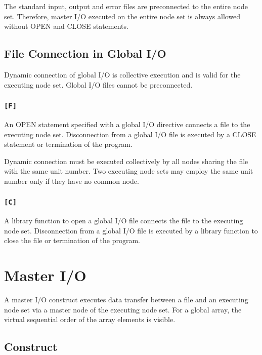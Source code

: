   The standard input, output and error files are preconnected to the
  entire node set.
  Therefore, master I/O executed on the entire node set is always
  allowed without OPEN and CLOSE statements.


  \subsection{File Connection in Global I/O}

  Dynamic connection of global I/O is collective execution and
  is valid for the executing node set.
  Global I/O files cannot be preconnected.

  \subsubsection*{\tt [F]}

  An OPEN statement specified with a global I/O directive connects a
  file to the executing node set.
  Disconnection from a global I/O file is executed by a CLOSE statement
  or termination of the program.

  Dynamic connection must be executed collectively by all nodes sharing
  the file with the same unit number.
  Two executing node sets may employ the same unit number only if they
  have no common node.

  \subsubsection*{\tt [C]}

  A library function to open a global I/O file connects the file to the
  executing node set.
  Disconnection from a global I/O file is executed by a library function
  to close the file or termination of the program.

  \section{Master I/O}

  A master I/O construct executes data transfer between a file and an
  executing node set via a master node of the executing node set.
  For a global array, the virtual sequential order of the array elements
  is visible.

  \subsection{\mio Construct}
  

